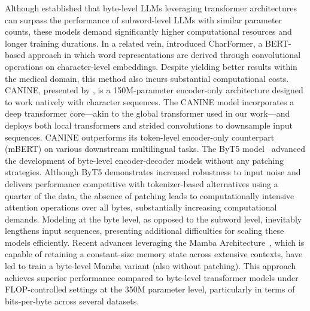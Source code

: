 Although \cite{Choe2019BridgingTG} established that byte-level LLMs leveraging transformer architectures can surpass the performance of subword-level LLMs with similar parameter counts, these models demand significantly higher computational resources and longer training durations. In a related vein, \cite{el2020characterbert} introduced CharFormer, a BERT-based approach in which word representations are derived through convolutional operations on character-level embeddings. Despite yielding better results within the medical domain, this method also incurs substantial computational costs. CANINE, presented by \cite{clark2022canine}, is a 150M-parameter encoder-only architecture designed to work natively with character sequences. The CANINE model incorporates a deep transformer core—akin to the global transformer used in our work—and deploys both local transformers and strided convolutions to downsample input sequences. CANINE outperforms its token-level encoder-only counterpart (mBERT) on various downstream multilingual tasks. The ByT5 model~\citep{xue2022byt5} advanced the development of byte-level encoder-decoder models without any patching strategies. Although ByT5 demonstrates increased robustness to input noise and delivers performance competitive with tokenizer-based alternatives using a quarter of the data, the absence of patching leads to computationally intensive attention operations over all bytes, substantially increasing computational demands. Modeling at the byte level, as opposed to the subword level, inevitably lengthens input sequences, presenting additional difficulties for scaling these models efficiently. Recent advances leveraging the Mamba Architecture~\citep{gu2023mamba}, which is capable of retaining a constant-size memory state across extensive contexts, have led \cite{wang2024mambabyte} to train a byte-level Mamba variant (also without patching). This approach achieves superior performance compared to byte-level transformer models under FLOP-controlled settings at the 350M parameter level, particularly in terms of bits-per-byte across several datasets.

